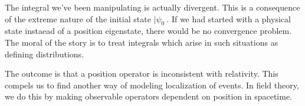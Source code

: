 \begin{rmk}
The integral we've been manipulating is actually divergent. This
is a consequence of the extreme nature of the initial state
$|\psi_{0}\>$. If we had started with a physical state instaead
of a position eigenstate, there would be no convergence
problem. The moral of the story is to treat integrals which arise
in such situations as defining distributions.
\end{rmk}

The outcome is that a position operator is inconsistent with
relativity. This compels us to find another way of modeling
localization of events. In field theory, we do this by making
observable operators dependent on position in spacetime.
